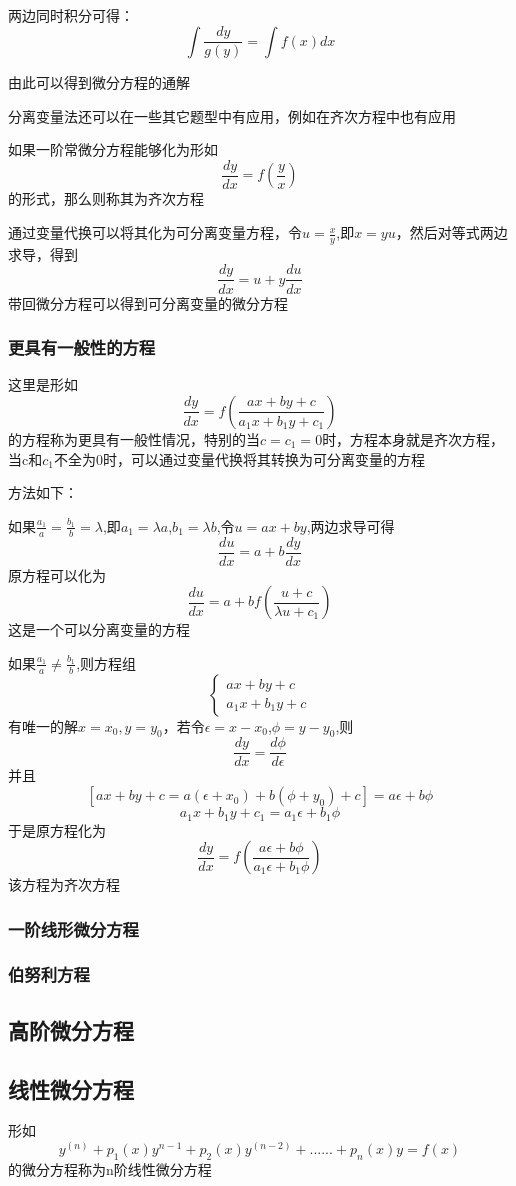\documentclass{article}
\begin{document}
两边同时积分可得：
\[\int{\frac{dy}{g(y)}}=\int{f(x)dx}\]

由此可以得到微分方程的通解

分离变量法还可以在一些其它题型中有应用，例如在齐次方程中也有应用

如果一阶常微分方程能够化为形如
\[\frac{dy}{dx}=f\left(\frac{y}{x}\right)\]
的形式，那么则称其为齐次方程

通过变量代换可以将其化为可分离变量方程，令$u=\frac{x}{y}$,即$x=yu$，然后对等式两边求导，得到
\[\frac{dy}{dx}=u+y\frac{du}{dx}\]
带回微分方程可以得到可分离变量的微分方程
\subsubsection{更具有一般性的方程}
这里是形如
\[\frac{dy}{dx}=f\left(\frac{ax+by+c}{a_1x+b_1y+c_1}\right)\]
的方程称为更具有一般性情况，特别的当$c=c_1=0$时，方程本身就是齐次方程，当c和$c_1$不全为0时，可以通过变量代换将其转换为可分离变量的方程

方法如下：

如果$\frac{a_1}{a}=\frac{b_1}{b}=\lambda$,即$a_1=\lambda a$,$b_1=\lambda b$,令$u=ax+by$,两边求导可得$$\frac{du}{dx}=a+b\frac{dy}{dx}$$
原方程可以化为
\[\frac{du}{dx}=a+bf\left(\frac{u+c}{\lambda u+c_1}\right)\]
这是一个可以分离变量的方程

如果$\frac{a_1}{a}\neq\frac{b_1}{b}$,则方程组
\[\begin{cases}
ax+by+c \\
a_1x+b_1y+c
\end{cases}\]有唯一的解$x=x_0,y=y_0$，若令$\epsilon=x-x_0$,$\phi=y-y_0$,则
\[\frac{dy}{dx}=\frac{d\phi}{d\epsilon}\]
并且
\[[ax+by+c=a(\epsilon+x_0)+b(\phi+y_0)+c]=a\epsilon+b\phi\]
\[a_1x+b_1y+c_1=a_1\epsilon+b_1\phi\]
于是原方程化为
\[\frac{dy}{dx}=f\left(\frac{a\epsilon+b\phi}{a_1\epsilon+b_1\phi}\right)\]
该方程为齐次方程
\subsubsection{一阶线形微分方程}
\subsubsection{伯努利方程}
\subsection{高阶微分方程}
\subsection{线性微分方程}
形如
\[y^{(n)}+p_1(x)y^{n-1}+p_2(x)y^{(n-2)}+......+p_n(x)y=f(x)\]
的微分方程称为n阶线性微分方程
\end{document}
